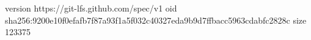 version https://git-lfs.github.com/spec/v1
oid sha256:9200e10f0efafb7f87a93f1a5f032c40327eda9b9d7ffbacc5963cdabfc2828c
size 123375

